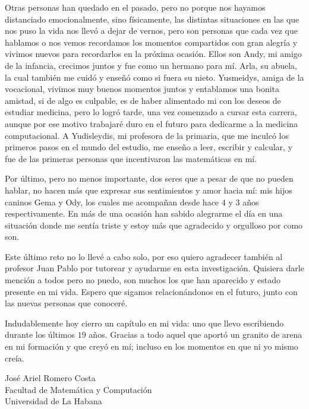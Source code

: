 \begin{acknowledgements}
	Otras personas han quedado en el pasado, pero no porque nos hayamos distanciado emocionalmente, sino físicamente, las distintas situaciones en las que nos puso la vida nos llevó a dejar de vernos, pero son personas que cada vez que hablamos o nos vemos recordamos los momentos compartidos con gran alegría y vivimos nuevos para recordarlos en la próxima ocasión. Ellos son Andy, mi amigo de la infancia, crecimos juntos y fue como un hermano para mí. Arla, su abuela, la cual también me cuidó y enseñó como si fuera su nieto. Yusmeidys, amiga de la vocacional, vivimos muy buenos momentos juntos y entablamos una bonita amistad, si de algo es culpable, es de haber alimentado mi  con los deseos de estudiar medicina, pero lo logró tarde, una vez comenzado a cursar esta carrera, aunque por ese motivo trabajaré duro en el futuro para dedicarme a la medicina computacional. A Yudisleydis, mi profesora de la primaria, que me inculcó los primeros pasos en el mundo del estudio, me enseño a leer, escribir y calcular, y fue de las primeras personas que incentivaron las matemáticas en mí.

	Por último, pero no menos importante, dos seres que a pesar de que no pueden hablar, no hacen más que expresar sus sentimientos y amor hacia mí: mis hijos caninos Gema y Ody, los cuales me acompañan desde hace $4$ y $3$ años respectivamente. En más de una ocasión han sabido alegrarme el día en una situación donde me sentía triste y estoy más que agradecido y orgulloso por como son.

	Este último reto no lo llevé a cabo solo, por eso quiero agradecer también al profesor Juan Pablo por tutorear y ayudarme en esta investigación. Quisiera darle mención a todos pero no puedo, son muchos los que han aparecido y estado presente en mi vida. Espero que sigamos relacionándonos en el futuro, junto con las nuevas personas que conoceré.

	\begin{phrase}[3in]
		Indudablemente hoy cierro un capítulo en mi vida: uno que llevo escribiendo durante los últimos $19$ años. Gracias a todo aquel que aportó un granito de arena en mi formación y que creyó en mí; incluso en los momentos en que ni yo mismo creía.
	\end{phrase}

	\begin{flushright}
		José Ariel Romero Costa \\
		Facultad de Matemática y Computación \\
		Universidad de La Habana
	\end{flushright}
\end{acknowledgements}